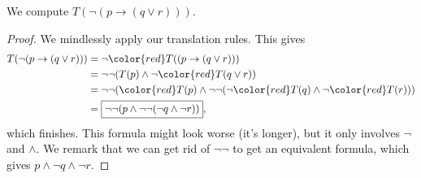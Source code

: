 \documentclass[../notes.tex]{subfiles}
\begin{document}
\begin{exe}
	We compute $T(\lnot(p\to(q\lor r)))$.
\end{exe}
\begin{proof}
	We mindlessly apply our translation rules. This gives
	\begin{align*}
		T(\lnot(p\to(q\lor r))) &= \lnot {\color{red}T((p\to(q\lor r)))} \\
		&= \lnot\lnot(T(p)\land\lnot {\color{red}T(q\lor r)}) \\
		&= \lnot\lnot({\color{red}T(p)}\land\lnot\lnot(\lnot {\color{red}T(q)}\land\lnot {\color{red}T(r)})) \\
		&= \boxed{\lnot\lnot(p\land\lnot\lnot(\lnot q\land\lnot r))},
	\end{align*}
	which finishes. This formula might look worse (it's longer), but it only involves $\lnot$ and $\land$. We remark that we can get rid of $\lnot\lnot$ to get an equivalent formula, which gives $p\land\lnot q\land\lnot r$.
\end{proof}
\end{document}
